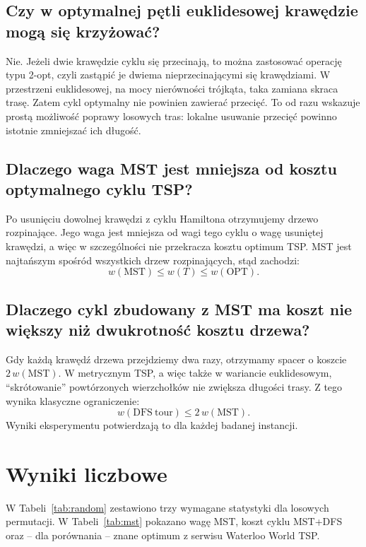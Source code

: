\documentclass[12pt,a4paper]{article}
\begin{document}
\subsection*{Czy w optymalnej pętli euklidesowej krawędzie mogą się krzyżować?}
Nie. Jeżeli dwie krawędzie cyklu się przecinają, to można zastosować operację typu 2-opt,
czyli zastąpić je dwiema nieprzecinającymi się krawędziami. W przestrzeni euklidesowej,
na mocy nierówności trójkąta, taka zamiana skraca trasę. Zatem cykl optymalny nie powinien
zawierać przecięć. To od razu wskazuje prostą możliwość poprawy losowych tras:
lokalne usuwanie przecięć powinno istotnie zmniejszać ich długość.

\subsection*{Dlaczego waga MST jest mniejsza od kosztu optymalnego cyklu TSP?}
Po usunięciu dowolnej krawędzi z cyklu Hamiltona otrzymujemy drzewo rozpinające.
Jego waga jest mniejsza od wagi tego cyklu o wagę usuniętej krawędzi, a więc w szczególności
nie przekracza kosztu optimum TSP. MST jest najtańszym spośród wszystkich drzew rozpinających,
stąd zachodzi:
\[
w(\mathrm{MST}) \leq w(T) \leq w(\mathrm{OPT}).
\]

\subsection*{Dlaczego cykl zbudowany z MST ma koszt nie większy niż dwukrotność kosztu drzewa?}
Gdy każdą krawędź drzewa przejdziemy dwa razy, otrzymamy spacer o koszcie \(2\,w(\mathrm{MST})\).
W metrycznym TSP, a więc także w wariancie euklidesowym, ``skrótowanie'' powtórzonych wierzchołków
nie zwiększa długości trasy. Z tego wynika klasyczne ograniczenie:
\[
w(\mathrm{DFS\ tour}) \leq 2\,w(\mathrm{MST}).
\]
Wyniki eksperymentu potwierdzają to dla każdej badanej instancji.

\section{Wyniki liczbowe}
W Tabeli~\ref{tab:random} zestawiono trzy wymagane statystyki dla losowych permutacji.
W Tabeli~\ref{tab:mst} pokazano wagę MST, koszt cyklu MST+DFS oraz -- dla porównania --
znane optimum z serwisu Waterloo World TSP.
\end{document}
